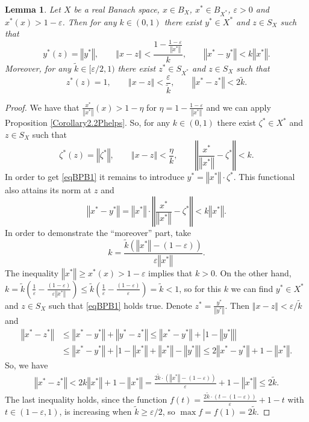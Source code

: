 \documentclass[11pt,a4paper]{amsart}
\newcommand{\eps}{\varepsilon}
\newcommand{\norm}[1]{\left\Vert#1\right\Vert}
\numberwithin{equation}{section}
\theoremstyle{plain}
\newtheorem{lemma}[theorem]{Lemma}
\theoremstyle{definition}
\renewcommand{\leq}{\leqslant}
\renewcommand{\geq}{\geqslant}
\renewcommand{\le}{\leqslant}
\renewcommand{\ge}{\geqslant}
\begin{document}
\begin{lemma} \label{LemmaBPB} Let $X$ be a real Banach space, $x\in B_X$, $x^*\in B_{X^*}$, $\eps > 0$ and $x^*(x)> 1-\eps$. Then for any $k\in (0,1)$ there exist $y^*\in X^*$ and $z\in S_X$ such that 
\begin{equation}\label{eqBPB1}
 y^*(z) = \norm{y^*},\qquad \norm{x-z} < \frac{1-\frac{1-\eps}{\norm{x^*}}}{k}, \qquad \norm{x^*-y^*} <  k \norm{x^*}.
\end{equation}\label{eqBPB2}
Moreover, for any $\tilde{k}\in [\eps/2, 1)$ there exist $z^*\in S_{X^*}$ and $z\in S_X$ such that 
\begin{equation} 
 z^*(z) = 1,\qquad \norm{x-z} < \frac{\eps}{\tilde{k}}, \qquad \norm{x^*-{z}^*} <  2\tilde{k}.
\end{equation}
\end{lemma}
\begin{proof}
We have that $\frac{x^*}{\norm{x^*}}(x)> 1-\eta$ for $\eta=1-\frac{1-\eps}{\norm{x^*}}$ and we can apply Proposition \ref{Corollary2.2Phelps}. So, for any $k\in (0,1)$ there exist $\zeta^*\in X^*$ and $z\in S_X$ such that 
\begin{equation*} 
 \zeta^*(z) = \norm{\zeta^*},\qquad \norm{x-z} < \frac{\eta}{k}, \qquad \norm{\frac{x^*}{\norm{x^*}}-\zeta^*} <  k.
\end{equation*}
In order to get \eqref{eqBPB1} it remains to introduce $y^*=\norm{x^*}\cdot\zeta^*$. This functional also attains its norm at $z$ and 
\begin{equation*} 
\norm{x^*-{y^*}}= \norm{x^*}\cdot\norm{\frac{x^*}{\norm{x^*}}-\zeta^*}<  k \norm{x^*}.
\end{equation*}
In order to demonstrate  the ``moreover'' part,  take
$$ 
k=\frac{\tilde{k}(\norm{x^*}-(1-\eps))}{\eps \norm{x^*}}.
$$
The inequality $\norm{x^*} \ge x^*(x) > 1-\eps$ implies that $k > 0$. On the other hand, $k=\tilde{k}\left(\frac{1}{\eps} - \frac{(1-\eps)}{\eps  \norm{x^*}}\right)\le \tilde{k}\left(\frac{1}{\eps} - \frac{(1-\eps)}{\eps}\right) = \tilde{k} < 1$, so for this $k$ we can find  $y^*\in X^*$ and $z\in S_X$ such that \eqref{eqBPB1} holds true. Denote $z^*=\frac{y^*}{\norm{y^*}}$.
Then $\norm{x-z} < \eps/\tilde{k}$ and
\begin{align*}
\norm{x^*-z^*} &\leq \norm{x^*-y^*} +\norm{y^*-z^*}\leq \norm{x^*-y^*} + |1-\norm{y^*}| \\ &\leq \norm{x^*-y^*}+|1-\norm{x^*}+\norm{x^*}-\norm{y^*}|\leq 2 \norm{x^*-y^*}+1 - \norm{x^*}.
\end{align*}
So, we have
\begin{align*}
\norm{x^*-z^*}<2k\norm{x^*}+1 - \norm{x^*}=\frac{2\tilde{k}\cdot (\norm{x^*}-(1-\eps))}{\eps}+1 - \norm{x^*}\leq 2\tilde{k}.
\end{align*}
The last inequality holds, since the function $f(t)=\frac{2\tilde{k}\cdot (t-(1-\eps))}{\eps}+1 - t$ with $t\in (1-\eps, 1)$, is increasing when $\tilde{k}\geq \eps/2$, so $\max f = f(1)=2\tilde{k}$.
\end{proof}
\end{document}
